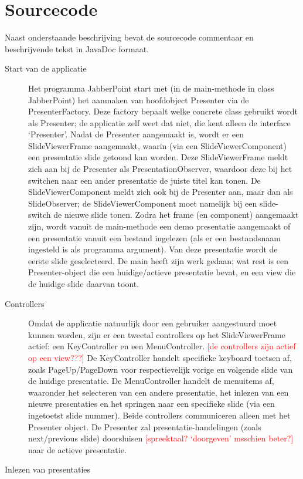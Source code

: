 \documentclass[a4paper]{article}
\newcommand{\todo}[1]{\textcolor{red}{[#1]}}
\begin{document}
\section{Sourcecode}
Naast onderstaande beschrijving bevat de sourcecode commentaar en beschrijvende tekst in JavaDoc formaat.

\begin{description}
\item[Start van de applicatie] Het programma JabberPoint start met (in de main-methode in class JabberPoint) het aanmaken van hoofdobject Presenter via de PresenterFactory. Deze factory bepaalt welke concrete class gebruikt wordt als Presenter; de applicatie zelf weet dat niet, die kent alleen de interface ‘Presenter’.
Nadat de Presenter aangemaakt is, wordt er een SlideViewerFrame aangemaakt, waarin (via een SlideViewerComponent) een presentatie slide getoond kan worden. Deze SlideViewerFrame meldt zich aan bij de Presenter als PresentationObserver, waardoor deze bij het switchen naar een ander presentatie de juiste titel kan tonen. De SlideViewerComponent meldt zich ook bij de Presenter aan, maar dan als SlideObserver; de SlideViewerComponent moet namelijk bij een slide-switch de nieuwe slide tonen.
Zodra het frame (en component) aangemaakt zijn, wordt vanuit de main-methode een demo presentatie aangemaakt of een presentatie vanuit een bestand ingelezen (als er een bestandsnaam ingesteld is als programma argument). Van deze presentatie wordt de eerste slide geselecteerd.
De main heeft zijn werk gedaan; wat rest is een Presenter-object die een huidige/actieve presentatie bevat, en een view die de huidige slide daarvan toont.
\item[Controllers]
Omdat de applicatie natuurlijk door een gebruiker aangestuurd moet kunnen worden, zijn er een tweetal controllers op het SlideViewerFrame actief: een KeyController en een MenuController. \todo{de controllers zijn actief op een view???}  De KeyController handelt specifieke keyboard toetsen af, zoals PageUp/PageDown voor respectievelijk vorige en volgende slide van de huidige presentatie. De MenuController handelt de menuitems af, waaronder het selecteren van een andere presentatie, het inlezen van een nieuwe presentaties en het springen naar een specifieke slide (via een ingetoetst slide nummer). Beide controllers communiceren alleen met het Presenter object. De Presenter zal presentatie-handelingen (zoals next/previous slide) doorsluisen \todo{spreektaal? `doorgeven' msschien beter?} naar de actieve presentatie.
\item[Inlezen van presentaties]

\end{description}
\end{document}

